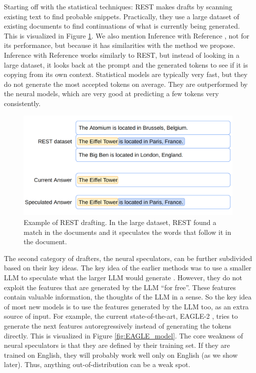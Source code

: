 Starting off with the statistical techniques: REST \cite{he2023rest} makes drafts by scanning existing text to find probable snippets. Practically, they use a large dataset of existing documents to find continuations of what is currently being generated. This is visualized in Figure \ref{fig:spec_dec_rest}. We also mention Inference with Reference \cite{yang2023inference}, not for its performance, but because it has similarities with the method we propose. Inference with Reference works similarly to REST, but instead of looking in a large dataset, it looks back at the prompt and the generated tokens to see if it is copying from its own context. Statistical models are typically very fast, but they do not generate the most accepted tokens on average. They are outperformed by the neural models, which are very good at predicting a few tokens very consistently. 

\begin{figure}[h]
	\centering
	\includegraphics[width=0.7\linewidth]{fig/spec_dec_rest.png}
	\caption{Example of REST \cite{he2023rest} drafting. In the large dataset, REST found a match in the documents and it speculates the words that follow it in the document.}
	\label{fig:spec_dec_rest}
\end{figure}

The second category of drafters, the neural speculators, can be further subdivided based on their key ideas. The key idea of the earlier methods was to use a smaller LLM to speculate what the larger LLM would generate \cite{leviathan2023fast}. However, they do not exploit the features that are generated by the LLM ``for free''. These features contain valuable information, the thoughts of the LLM in a sense. So the key idea of most new models is to use the features generated by the LLM too, as an extra source of input. For example, the current state-of-the-art, EAGLE-2 \cite{li2024eagle}, tries to generate the next features autoregressively instead of generating the tokens directly. This is visualized in Figure \ref{fig:EAGLE_model}. The core weakness of neural speculators is that they are defined by their training set. If they are trained on English, they will probably work well only on English (as we show later). Thus, anything out-of-distribution can be a weak spot.


